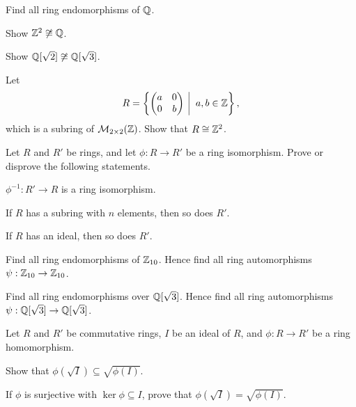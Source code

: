 \begin{problem}
    Find all ring endomorphisms of $\mathbb{Q}$.
\end{problem}

\begin{problem}
    Show $\mathbb{Z}^2 \not\cong \mathbb{Q}$.
\end{problem}

\begin{problem}
    Show $\mathbb{Q}[\sqrt2] \not\cong \mathbb{Q}[\sqrt3]$.
\end{problem}

\begin{problem}
    Let
    \[
        R = \left\{\begin{pmatrix}a&0\\0&b\end{pmatrix}\vert a,b \in \Z\right\},
    \]
    which is a subring of $\mathcal{M}_{2\times2}(\mathbb{Z})$. Show that $R \cong \mathbb{Z}^2$.
\end{problem}

\begin{problem}\label{problem-properties-of-ring-isomorphism}
    Let $R$ and $R'$ be rings, and let $\phi: R \to R'$ be a ring isomorphism. Prove or disprove the following statements.
    \begin{partquestions}{\alph*}
        \item $\phi^{-1}: R' \to R$ is a ring isomorphism.
        \item If $R$ has a subring with $n$ elements, then so does $R'$.
        \item If $R$ has an ideal, then so does $R'$.
    \end{partquestions}
\end{problem}

\begin{problem}
    Find all ring endomorphisms of $\mathbb{Z}_{10}$.\newline
    Hence find all ring automorphisms $\psi: \mathbb{Z}_{10} \to \mathbb{Z}_{10}$.
\end{problem}

\begin{problem}
    Find all ring endomorphisms over $\mathbb{Q}[\sqrt3]$.\newline
    Hence find all ring automorphisms $\psi: \mathbb{Q}[\sqrt3] \to \mathbb{Q}[\sqrt3]$.
\end{problem}

\begin{problem}
    Let $R$ and $R'$ be commutative rings, $I$ be an ideal of $R$, and $\phi: R\to R'$ be a ring homomorphism.
    \begin{partquestions}{\roman*}
        \item Show that $\phi(\sqrt I) \subseteq \sqrt{\phi(I)}$.
        \item If $\phi$ is surjective with $\ker\phi \subseteq I$, prove that $\phi(\sqrt I) = \sqrt{\phi(I)}$.
    \end{partquestions}
\end{problem}


